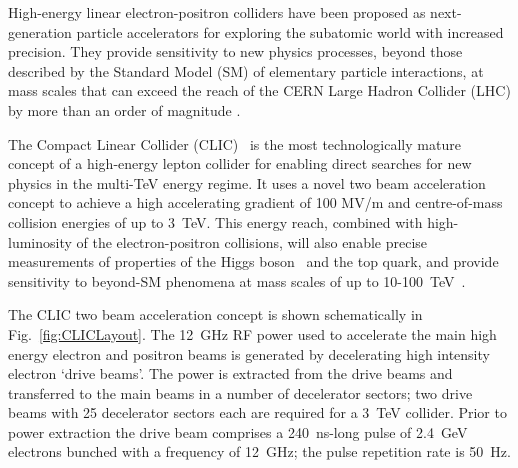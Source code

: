 \documentclass[%
 reprint,
 superscriptaddress,
 amsmath,
 amssymb,
 prl,
]{revtex4-1}
\begin{document}



High-energy linear electron-positron colliders have been proposed as 
next-generation particle accelerators for exploring the subatomic world with 
increased precision. They provide sensitivity to new physics processes, 
beyond those described by the Standard Model (SM) of elementary particle 
interactions, at mass scales that can exceed the reach of the CERN 
Large Hadron Collider (LHC) by more than an order of magnitude 
\cite{CLIC-staging}.

The Compact Linear Collider (CLIC)~\cite{CLICCDR} is the most technologically 
mature concept of a high-energy lepton collider for enabling direct searches 
for new physics in the multi-TeV energy regime. It uses a novel two 
beam acceleration concept to achieve a high accelerating gradient of 100 MV/m 
and centre-of-mass collision energies of up to 3~TeV. This energy reach, 
combined with high-luminosity of the electron-positron collisions, will also 
enable precise measurements of properties of the Higgs boson~\cite{CLIC-Higgs} 
and the top quark, and provide sensitivity to beyond-SM phenomena at mass 
scales of up to 10-100~TeV~\cite{CLIC-staging}.

The CLIC two beam acceleration concept is shown schematically in 
Fig.~\ref{fig:CLICLayout}. The 12~GHz RF power used to accelerate the main high 
energy electron and positron beams is generated by decelerating high intensity 
electron `drive beams'. The power is extracted from the drive beams and 
transferred to the main beams in a number of decelerator sectors; two drive 
beams with 25 decelerator sectors each are required for a 3~TeV collider. Prior 
to power extraction the drive beam comprises a 240~ns-long pulse of 2.4~GeV 
electrons bunched with a frequency of 12~GHz; the pulse repetition rate is 
50~Hz.
\end{document}
